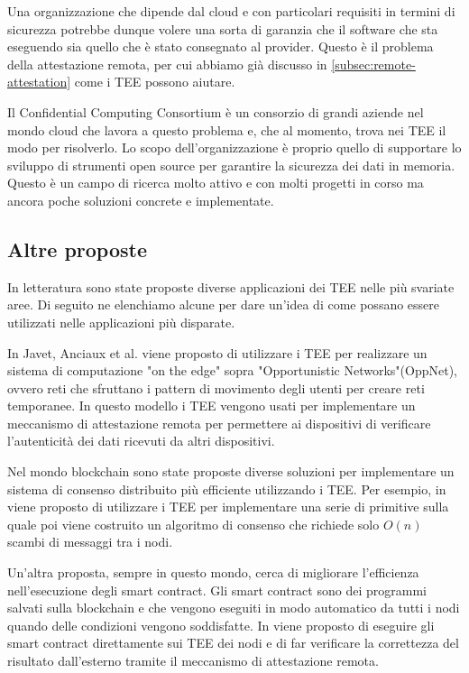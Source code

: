 \documentclass[12pt,italian]{report}
\begin{document}
Una organizzazione che dipende dal cloud e con particolari requisiti in
termini di sicurezza potrebbe dunque volere una sorta di garanzia che il
software che sta eseguendo sia quello che è stato consegnato al provider.
Questo è il problema della attestazione remota, per cui abbiamo già discusso
in \ref{subsec:remote-attestation} come i TEE possono aiutare.

Il Confidential Computing Consortium\cite{confidential_computing_consortium}
è un consorzio di grandi aziende nel mondo cloud che lavora a questo problema
e, che al momento, trova nei TEE il modo per risolverlo.
Lo scopo dell'organizzazione è proprio quello di supportare lo sviluppo
di strumenti open source per garantire la sicurezza dei dati in memoria.
Questo è un campo di ricerca molto attivo e con molti progetti in corso ma
ancora poche soluzioni concrete e implementate.

\subsection{Altre proposte}
\label{subsec:altre-proposte}
In letteratura sono state proposte diverse applicazioni dei TEE nelle più
svariate aree. Di seguito ne elenchiamo alcune per dare un'idea di come
possano essere utilizzati nelle applicazioni più disparate.

\bigbreak \noindent

In Javet, Anciaux et al.\cite{teeuses_edgeletcomputing} viene proposto di
utilizzare i TEE per realizzare un sistema di computazione "on the edge" sopra
"Opportunistic Networks"(OppNet), ovvero reti che sfruttano i
pattern di movimento degli utenti per creare reti temporanee.
In questo modello i TEE vengono usati per implementare un meccanismo di
attestazione remota per permettere ai dispositivi di verificare l'autenticità
dei dati ricevuti da altri dispositivi.

\bigbreak \noindent

Nel mondo blockchain sono state proposte diverse soluzioni per implementare
un sistema di consenso distribuito più efficiente utilizzando i TEE.
Per esempio, in \cite{teeuses_blockchainconsent} viene proposto di utilizzare
i TEE per implementare una serie di primitive sulla quale poi viene
costruito un algoritmo di consenso che richiede solo $O(n)$ scambi di messaggi
tra i nodi.

Un'altra proposta, sempre in questo mondo, cerca di migliorare l'efficienza
nell'esecuzione degli smart contract.
Gli smart contract sono dei programmi salvati sulla blockchain e che vengono
eseguiti in modo automatico da tutti i nodi quando delle condizioni vengono
soddisfatte.
In \cite{teeuses_smartcontract} viene proposto di eseguire gli smart contract
direttamente sui TEE dei nodi e di far verificare la correttezza del risultato
dall'esterno tramite il meccanismo di attestazione remota.
\end{document}
